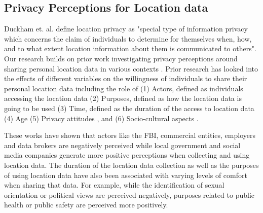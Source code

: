 

\subsection{Privacy Perceptions for Location data}
Duckham et. al. \cite{ducham} define location privacy as "special type of information
 privacy which concerns the claim of individuals to determine for themselves when,
 how, and to what extent location information about them is communicated to others".
 Our research builds on prior work investigating privacy perceptions around sharing personal location data in various contexts \cite{martin,colombia_privacy_study,ICADataCollection}. Prior research has looked into the effects of different variables on the willingness of individuals to share their personal location data including the role of (1) Actors, defined as individuals accessing the location data \cite{martin,ICADataCollection,cross_platform_social_media_data,employee_surveillance} (2) Purposes, defined as how the location data is going to be used \cite{martin, mobile_data_thesis, cross_platform_social_media_data} (3) Time, defined as the duration of the access to location data \cite{martin,mobile_data_thesis} (4) Age  \cite{colombia_privacy_study,location_privacy_students,privacy_older_adults} (5) Privacy attitudes \cite{personality_location,personality_privacy_perception_2016}, and  (6) Socio-cultural aspects \cite{location_privacy_SEM,mobile_data_thesis,privacy_covid,surveillance_covid}.

These works have shown that actors like the FBI, commercial entities, employers and data brokers are negatively perceived while local government and social media companies generate more positive perceptions when collecting and using location data. The duration of the location data collection as well as the purposes of using location data have also been associated with varying levels of comfort when sharing that data. For example, while the identification of sexual orientation or political views are perceived negatively, purposes related to public health or public safety are perceived more positively.

